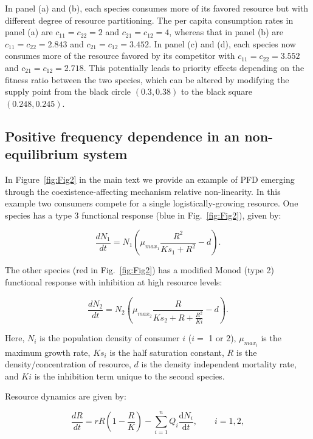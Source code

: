 In panel (a) and (b), each species consumes more of its favored resource but with different degree of resource partitioning. The per capita consumption rates in panel (a) are $c_{11} = c_{22} = 2$ and $c_{21} = c_{12} = 4$, whereas that in panel (b) are $c_{11} = c_{22} = 2.843$ and $c_{21} = c_{12} = 3.452$. In panel (c) and (d), each species now consumes more of the resource favored by its competitor with $c_{11} = c_{22} = 3.552$ and $c_{21} = c_{12} = 2.718$. This potentially leads to priority effects depending on the fitness ratio between the two species, which can be altered by modifying the supply point from the black circle $\left(0.3, 0.38\right)$ to the black square $\left(0.248, 0.245 \right)$. 
\par


\subsection*{Positive frequency dependence in an non-equilibrium system}
In Figure~\ref{fig:Fig2} in the main text we provide an example of PFD emerging through the coexistence-affecting mechanism relative non-linearity. In this example two consumers compete for a single logistically-growing resource. One species has a type 3 functional response (blue in Fig.~\ref{fig:Fig2}), given by: 

\begin{equation}
\frac{dN_{1}}{dt} = N_{1}(\mu _{max_{1}}\frac{R^2}{Ks_{1} + R^2}-d).
\tag{S3.3.1}\label{eq:S3.3.1}
\end{equation}

\noindent The other species (red in Fig.~\ref{fig:Fig2}) has a modified Monod (type 2) functional response with inhibition at high resource levels: 

\begin{equation}
\frac{dN_{2}}{dt} = N_{2}(\mu _{max_{2}}\frac{R}{Ks_{2} + R + \frac{R^2}{Ki}}-d).
\tag{S3.3.2}\label{eq:S3.3.2}
\end{equation}

\noindent Here, $N_{i}$ is the population density of consumer $i$ ($i = $ 1 or 2), $\mu_{max_{i}}$ is the maximum growth rate, $Ks_{i}$ is the half saturation constant, $R$ is the density/concentration of resource, $d$ is the density independent mortality rate, and $Ki$ is the inhibition term unique to the second species. 
\par


\noindent Resource dynamics are given by:

\begin{equation}
\frac{dR}{dt} = rR(1-\frac{R}{K}) - \sum_{i = 1}^{n} Q_{i}\frac{\mathrm{d}N_{i}}{\mathrm{d}t},\qquad i = 1,2, 
\tag{S3.3.3}\label{eq:S3.3.3}
\end{equation}

